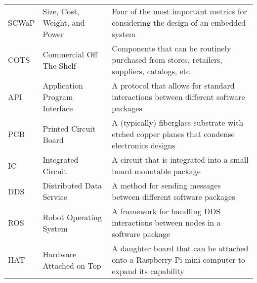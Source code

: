 \begin{longtable}{l m{} m{}}
        SCWaP & Size, Cost, Weight, and Power & Four of the most important metrics for considering the design of an embedded system \\
        COTS & Commercial Off The Shelf & Components that can be routinely purchased from stores, retailers, suppliers, catalogs, etc. \\
        API & Application Program Interface & A protocol that allows for standard interactions between different software packages \\
        PCB & Printed Circuit Board & A (typically) fiberglass substrate with etched copper planes that condense electronics designs \\
        IC & Integrated Circuit & A circuit that is integrated into a small board mountable package \\
        DDS & Distributed Data Service & A method for sending messages between different software packages \\
        ROS & Robot Operating System & A framework for handling DDS interactions between nodes in a software package \\
        HAT & Hardware Attached on Top & A daughter board that can be attached onto a Raspberry Pi mini computer to expand its capability
\end{longtable}
